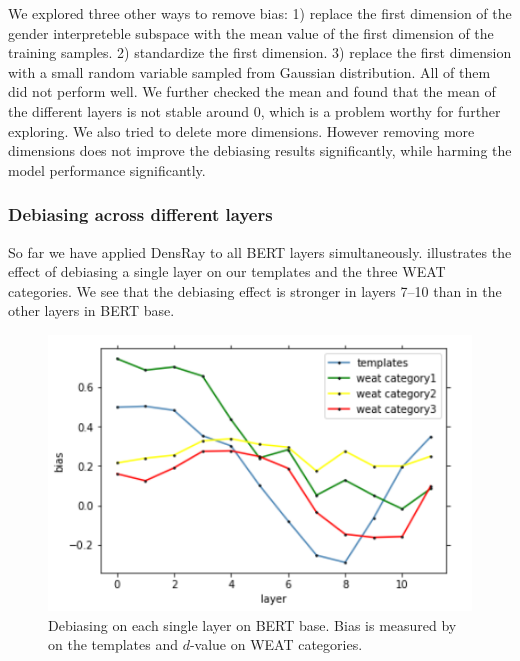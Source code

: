 We explored three other ways to remove bias: 1) replace the first dimension of the gender interpreteble subspace with the mean value of the first dimension of the training samples. 2) standardize the first dimension. 3) replace the first dimension with a small random variable sampled from Gaussian distribution. All of them did not perform well. We further checked the mean and found that the mean of the different layers is not stable around 0, which is a problem worthy for further exploring. We also tried to delete more dimensions. However removing more dimensions does not improve the debiasing results significantly, while harming the model performance significantly.


\subsubsection{Debiasing across different layers}
So far we have applied DensRay to all BERT layers simultaneously.
    illustrates the effect of
 debiasing a single  layer on our templates and the three
 WEAT categories. We see that the debiasing effect
is stronger in
layers 7--10  than in the other layers in BERT base.
\begin{figure}[ht]
	\centering
	\includegraphics[width=0.9\linewidth]{layers_base}
	\caption{Debiasing on each single layer on BERT base. Bias is measured by  on the templates and $d$-value on WEAT categories.}
\end{figure}

